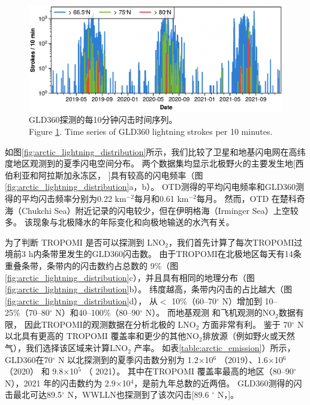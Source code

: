 \begin{figure}[!htbp]
\centering
\includegraphics[width=12cm]{./figures/arctic_gld360_tseries.png}
\caption{
GLD360探测的每10分钟闪击时间序列。\\
Figure \ref{fig:gld360_tseries}. Time series of GLD360 lightning strokes per 10 minutes.
}
\label{fig:gld360_tseries}
\end{figure}


如图\ref{fig:arctic_lightning_distribution}所示，我们比较了卫星和地基闪电网在高纬度地区观测到的夏季闪电空间分布。
两个数据集均显示北极野火的主要发生地[西伯利亚和阿拉斯加永冻区，
\citep{McCarty.2021}]具有较高的闪电频率（图\ref{fig:arctic_lightning_distribution}a，b）。
OTD测得的平均闪电频率和GLD360测得的平均闪击频率分别为0.22 km$^{-2}$每月和0.61 km$^{-2}$每月。
然而，OTD 在楚科奇海（Chukchi Sea）附近记录的闪电较少，但在伊明格海（Irminger Sea）上空较多。
该现象与北极降水的年际变化和向极地输送的水汽有关\citep{Bintanja.2020}。

为了判断 TROPOMI 是否可以探测到 LNO$_2$，我们首先计算了每次TROPOMI过境前3 h内条带里发生的GLD360闪击数。
由于TROPOMI在北极地区每天有14条重叠条带，条带内的闪击数约占总数的 9\%（图\ref{fig:arctic_lightning_distribution}c），并且具有相同的地理分布（图\ref{fig:arctic_lightning_distribution}b）。
纬度越高，条带内闪击的占比越大（图\ref{fig:arctic_lightning_distribution}d），
从$<$ 10\%（60--70$^{\circ}$ N）增加到 10--25\%（70--80$^{\circ}$ N）和40--100\%（80--90$^{\circ}$ N）。
而地基观测\citep{Schmale.2018} 和飞机观测\citep{Jacob.2010}的NO$_2$数据有限，
因此TROPOMI的观测数据在分析北极的 LNO$_2$ 方面非常有利。
鉴于 70$^{\circ}$ N 以北具有更高的 TROPOMI 覆盖率和更少的其他NO$_2$排放源（例如野火或天然气），我们选择该区域来计算LNO$_2$ 产率。
如表\ref{table:arctic_emission}）所示，GLD360在70$^{\circ}$ N 以北探测到的夏季闪击数分别为 1.2$\times$10$^6$ （2019）、1.6$\times$10$^6$ （2020） 和 9.8$\times$10$^5$ （ 2021）。
其中在TROPOMI 覆盖率最高的地区（80--90$^{\circ}$ N），2021 年的闪击数约为 2.9$\times$10$^4$，是前九年总数的近两倍\citep{networktotal.2021}。
GLD360测得的闪击最北可达89.5$^{\circ}$ N，WWLLN也探测到了该次闪击[89.6 $^{\circ}$ N，\citet{Holzworth.2021}]。


